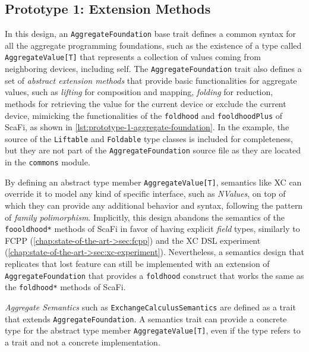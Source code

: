 \subsection{Prototype 1: Extension Methods} \label{chap:design->sec:dsl->subsec:prototype-1-extension-methods}

In this design, an \texttt{AggregateFoundation} base trait defines a common syntax for all the aggregate programming foundations, such as the existence of a type called \texttt{AggregateValue[T]} that represents a collection of values coming from neighboring devices, including self.
%
The \texttt{AggregateFoundation} trait also defines a set of \textit{abstract extension methods} that provide basic functionalities for aggregate values, such as \textit{lifting} for composition and mapping, \textit{folding} for reduction, methods for retrieving the value for the current device or exclude the current device, mimicking the functionalities of the \texttt{foldhood} and \texttt{fooldhoodPlus} of ScaFi, as shown in \cref{lst:prototype-1-aggregate-foundation}.
%
In the example, the source of the \texttt{Liftable} and \texttt{Foldable} type classes is included for completeness, but they are not part of the \texttt{AggregateFoundation} source file as they are located in the \texttt{commons} module.



By defining an abstract type member \texttt{AggregateValue[T]}, semantics like \ac{XC} can override it to model any kind of specific interface, such as \textit{NValues}, on top of which they can provide any additional behavior and syntax, following the pattern of \textit{family polimorphism}.
%
Implicitly, this design abandons the  semantics of the \texttt{foooldhood*} methods of ScaFi in favor of having explicit \textit{field} types, similarly to FCPP (\cref{chap:state-of-the-art->sec:fcpp}) and the \ac{XC} \ac{DSL} experiment (\cref{chap:state-of-the-art->sec:xc-experiment}).
%
Nevertheless, a semantics design that replicates that lost feature can still be implemented with an extension of \texttt{AggregateFoundation} that provides a \texttt{foldhood} construct that works the same as the \texttt{foldhood*} methods of ScaFi.

\textit{Aggregate Semantics} such as \texttt{ExchangeCalculusSemantics} are defined as a trait that extends \texttt{AggregateFoundation}.
%
A semantics trait can provide a concrete type for the abstract type member \texttt{AggregateValue[T]}, even if the type refers to a trait and not a concrete implementation.

